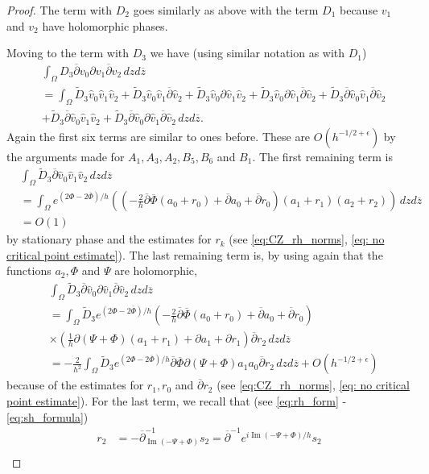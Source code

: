 \documentclass[a4paper, 10pt, twoside, notitlepage]{amsart}
\theoremstyle{plain}
\newcommand{\Om}{\Omega}
\numberwithin{equation}{section}
\newcommand {\p} {\partial}
\newcommand{\e}{\epsilon}
\newcommand{\dbar}{\ol{\p}}
\newcommand{\ol}[1]{\overline{#1}}
\newcommand{\oz}{\overline{z}}
\DeclareMathOperator {\Imm} {Im}
\begin{document}
\begin{proof}
	The term with $D_2$ goes similarly as above with the term $D_1$ because $v_1$ and $v_2$ have holomorphic phases.
	
	Moving to the term with $D_3$ we have (using similar notation as with $D_1$)
	\begin{align*}
		&\int_{\Om}D_3\dbar v_0 \p v_1\dbar v_2\,dzd\oz\\
		&= \int_{\Om}\tilde D_3\hat{v}_0\hat{v}_1\hat{v}_2 + \tilde D_3\hat{v}_0\hat{v}_1\dbar \hat{v}_2 + \tilde D_3\hat{v}_0\p \hat{v}_1\hat{v}_2 + \tilde D_3\hat{v}_0\p \hat{v}_1\dbar \hat{v}_2 + \tilde D_3\dbar \hat{v}_0\hat{v}_1\dbar \hat{v}_2\\
		&+ \tilde D_3\dbar \hat{v}_0\hat{v}_1\hat{v}_2 + \tilde D_3\dbar \hat{v}_0\p \hat{v}_1\dbar \hat{v}_2\,dzd\oz.
	\end{align*}
	Again the first six terms are similar to ones before. These are $O(h^{-1/2+\e})$ by the arguments made for $A_1, A_3, A_2, B_5, B_6$ and $B_1$. The first remaining term is
	\begin{align*}
		&\int_{\Om}\tilde D_3\dbar \hat{v}_0 \hat{v}_1\hat{v}_2\,dzd\oz\\
		&= \int_{\Om}e^{(2\Phi-2\ol{\Phi})/h}\left(\left(-\frac{2}{h}\dbar \ol{\Phi}(a_0 + r_0) + \dbar a_0 + \dbar r_0\right)(a_1+r_1)(a_2+r_2)\right)\,dzd\oz\\
		&= O(1)
	\end{align*}
	by stationary phase and the estimates for $r_k$ (see \eqref{eq:CZ_rh_norms}, \eqref{eq: no critical point estimate}). The last remaining term is, by using again that the functions $a_2, \Phi$ and $\Psi$ are holomorphic,
	\begin{align*}
		&\int_{\Om}\tilde D_3 \dbar \hat{v}_0\p \hat{v}_1\dbar \hat{v}_2\,dzd\oz\\
		&= \int_{\Om}\tilde D_3 e^{(2\Phi -2\ol{\Phi})/h}\left(-\frac{2}{h}\dbar\ol{\Phi}(a_0+r_0) + \dbar a_0 + \dbar r_0\right)\\
		&\times\left(\frac{1}{h}\p(\Psi+\Phi)(a_1+r_1) + \p a_1 + \p r_1\right)\dbar r_2\,dzd\oz\\
		&= -\frac{2}{h^2}\int_{\Om}\tilde D_3 e^{(2\Phi -2\ol{\Phi})/h}\dbar\ol{\Phi}\p(\Psi+\Phi)a_1a_0\dbar r_2\,dzd\oz + O(h^{-1/2+\e})
	\end{align*}
	because of the estimates for $r_1, r_0$ and $\dbar r_2$ (see \eqref{eq:CZ_rh_norms}, \eqref{eq: no critical point estimate}). For the last term, we recall that (see \eqref{eq:rh_form} - \eqref{eq:sh_formula})
	\begin{align*}
		r_2 &= - \dbar^{-1}_{\Imm(-\Psi + \Phi)}s_2 = \dbar^{-1}e^{i\Imm(-\Psi + \Phi)/h}s_2\\

\end{align*}
\end{proof}
\end{document}
